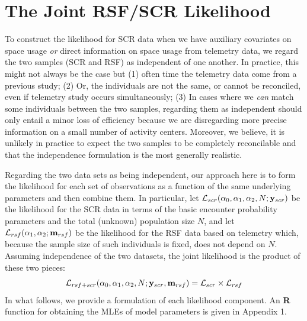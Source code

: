 \documentclass[12pt]{article}
\begin{document}
\section{The Joint RSF/SCR Likelihood}

To construct the likelihood for SCR data when we have auxiliary
covariates on space usage {\it or} direct information on space usage
from telemetry data, we regard the two samples (SCR and RSF) as
independent of one another. In practice, this might not always be the
case but (1) often time the telemetry data come from a previous study;
(2) Or, the individuals are not the same, or cannot be reconciled, even if telemetry study occurs simultaneously;
(3) In cases where we {\it
  can} match some individuals between the two samples, regarding them as
independent should only entail a minor
loss of efficiency
because we are disregarding more precise information on a small number
of activity centers. Moreover, we believe, it is unlikely in practice
to expect the two samples to be completely reconcilable and that the
independence formulation is the most generally realistic.

Regarding the two data sets as being independent, our approach here
is to form the likelihood for each set of observations as a function
of the same underlying parameters and then combine them. In
particular, let ${\cal L}_{scr}(\alpha_{0}, \alpha_{1}, \alpha_{2}, N;
{\bf y}_{scr})$
be the likelihood for the SCR data in terms of the basic encounter
probability parameters and the total (unknown) population size $N$,
and let ${\cal L}_{rsf}(\alpha_{1},\alpha_{2}; {\bf m}_{rsf})$ be the
likelihood for the RSF data based on telemetry which, because the
sample size of such individuals is fixed, does not depend on $N$.
Assuming independence of the two datasets, the
joint likelihood is the product of these two pieces:
\[
{\cal L}_{rsf+scr}(\alpha_{0},\alpha_{1},\alpha_{2},N; {\bf y}_{scr},{\bf
  m}_{rsf})  = {\cal L}_{scr} \times {\cal L}_{rsf}
\]
In what follows, we provide a formulation of each likelihood
component. An  {\bf R} function for obtaining the MLEs of
model parameters is given in Appendix 1.
\end{document}
